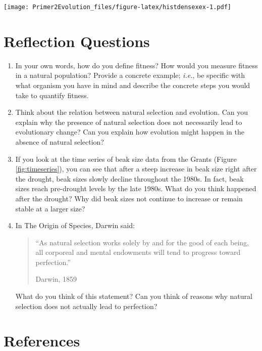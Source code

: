 \documentclass[
]{book}
\begin{document}
\texttt{[image: Primer2Evolution\_files/figure-latex/histdensexex-1.pdf]}

\hypertarget{reflection-questions-2}{%
\section{Reflection Questions}\label{reflection-questions-2}}

\begin{enumerate}
\def\labelenumi{\arabic{enumi}.}
\item
  In your own words, how do you define fitness? How would you measure fitness in a natural population? Provide a concrete example; \emph{i.e.}, be specific with what organism you have in mind and describe the concrete steps you would take to quantify fitness.
\item
  Think about the relation between natural selection and evolution. Can you explain why the presence of natural selection does not necessarily lead to evolutionary change? Can you explain how evolution might happen in the absence of natural selection?
\item
  If you look at the time series of beak size data from the Grants (Figure \ref{fig:timeseries}), you can see that after a steep increase in beak size right after the drought, beak sizes slowly decline throughout the 1980s. In fact, beak sizes reach pre-drought levels by the late 1980s. What do you think happened after the drought? Why did beak sizes not continue to increase or remain stable at a larger size?
\item
  In The Origin of Species, Darwin said:

  \begin{quote}
  ``As natural selection works solely by and for the good of each being, all corporeal and mental endowments will tend to progress toward perfection.''

  Darwin, 1859
  \end{quote}

  What do you think of this statement? Can you think of reasons why natural selection does not actually lead to perfection?
\end{enumerate}

\hypertarget{references-3}{%
\section{References}\label{references-3}}
\end{document}
